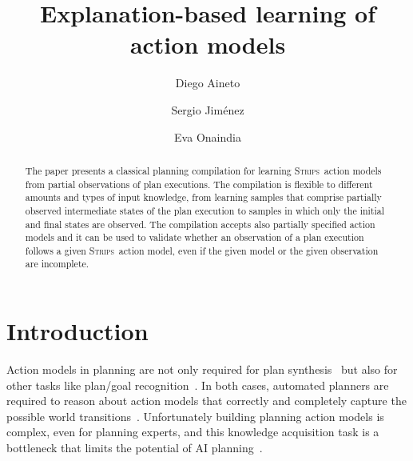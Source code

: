 \documentclass[runningheads]{llncs}
\newcommand{\strips}{\textsc{Strips}}     %
\begin{document}
%
\title{Explanation-based learning of action models}
%
%
\author{Diego Aineto \and
Sergio Jim\'enez \and
Eva Onaindia}
%
%
%
\maketitle              %
%
\begin{abstract}
The paper presents a classical planning compilation for learning \strips\ action models from partial observations of plan executions. The compilation is flexible to different amounts and types of input knowledge, from learning samples that comprise partially observed intermediate states of the plan execution to samples in which only the initial and final states are observed. The compilation accepts also partially specified action models and it can be used to validate whether an observation of a plan execution follows a given \strips\ action model, even if the given model or the given observation are incomplete.
\end{abstract}



\section{Introduction}

Action models in planning are not only required for plan synthesis~\cite{ghallab2004automated} but also for other tasks like plan/goal recognition~\cite{ramirez2009plan,ramirez2012plan}. In both cases, automated planners are required to reason about action models that correctly and completely capture the possible world transitions~\cite{geffner:book:2013}. Unfortunately building planning action models is complex, even for planning experts, and this knowledge acquisition task is a bottleneck that limits the potential of AI planning~\cite{kambhampati:modellite:AAAI2007}.
\end{document}
